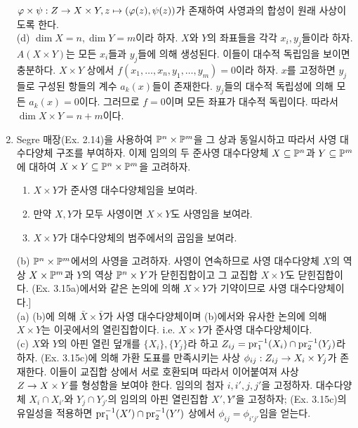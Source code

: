\begin{enumerate}[label=\tb{3.\arabic*.},itemindent=0mm,itemsep=4mm]
		$\varphi\times\psi:Z\rightarrow X\times Y,z\mapsto(\varphi(z),\psi(z))$가 존재하여 사영과의 합성이 원래 사상이도록 한다.\\
		(d) $\dim X=n,\dim Y=m$이라 하자. $X$와 $Y$의 좌표들을 각각 $x_i,y_j$들이라 하자.
		$A(X\times Y)$는 모든 $x_i$들과 $y_j$들에 의해 생성된다. 이들이 대수적 독립임을 보이면 충분하다.
		$X\times Y$ 상에서 $f(x_1,\ldots,x_n,y_1,\ldots,y_m)=0$이라 하자.
		$x$를 고정하면 $y_j$들로 구성된 항들의 계수 $a_k(x)$들이 존재한다. $y_j$들의 대수적 독립성에 의해 모든 $a_k(x)=0$이다.
		그러므로 $f=0$이며 모든 좌표가 대수적 독립이다. 따라서 $\dim X\times Y=n+m$이다.
		\item {} Segre 매장(Ex. 2.14)을 사용하여 $\mathbb{P}^n\times\mathbb{P}^m$을 그 상과 동일시하고
		따라서 사영 대수다양체 구조를 부여하자. 이제 임의의 두 준사영 대수다양체 $X\subseteq\mathbb{P}^n$과 $Y\subseteq\mathbb{P}^m$에 대하여
		$X\times Y\subseteq\mathbb{P}^n\times\mathbb{P}^m$을 고려하자.
		\begin{enumerate}[label=(\alph*)]
		\item $X\times Y$가 준사영 대수다양체임을 보여라.
		\item 만약 $X,Y$가 모두 사영이면 $X\times Y$도 사영임을 보여라.
		\end{enumerate}
		\begin{enumerate}[label=*(\alph*)]
		\setcounter{enumii}{2}
		\item $X\times Y$가 대수다양체의 범주에서의 곱임을 보여라.
		\end{enumerate}
		\sol (b) $\mathbb{P}^n\times\mathbb{P}^m$에서의 사영을 고려하자.
		사영이 연속하므로 사영 대수다양체 $X$의 역상 $X\times\mathbb{P}^m$과 $Y$의 역상 $\mathbb{P}^n\times Y$가 닫힌집합이고
		그 교집합 $X\times Y$도 닫힌집합이다. (Ex. 3.15a)에서와 같은 논의에 의해 $X\times Y$가 기약이므로 사영 대수다양체이다.]\\
		(a) (b)에 의해 $\bar X\times\bar Y$가 사영 대수다양체이며 (b)에서와 유사한 논의에 의해 $X\times Y$는 이곳에서의 열린집합이다.
		i.e. $X\times Y$가 준사영 대수다양체이다.\\
		(c) $X$와 $Y$의 아핀 열린 덮개를 $\{X_i\},\{Y_j\}$라 하고 $Z_{ij}=\mathrm{pr}_1^{-1}(X_i)\cap\mathrm{pr}_2^{-1}(Y_j)$라 하자.
		(Ex. 3.15c)에 의해 가환 도표를 만족시키는 사상 $\phi_{ij}:Z_{ij}\rightarrow X_i\times Y_j$가 존재한다.
		이들이 교집합 상에서 서로 호환되며 따라서 이어붙여져 사상 $Z\rightarrow X\times Y$를 형성함을 보여야 한다.
		임의의 첨자 $i,i',j,j'$을 고정하자. 대수다양체 $X_i\cap X_{i'}$와 $Y_j\cap Y_{j'}$의
		임의의 아핀 열린집합 $X',Y'$을 고정하자;
		(Ex. 3.15c)의 유일성을 적용하면 $\mathrm{pr}_1^{-1}(X')\cap\mathrm{pr}_2^{-1}(Y')$ 상에서 $\phi_{ij}=\phi_{i'j'}$임을 얻는다.

\end{enumerate}
